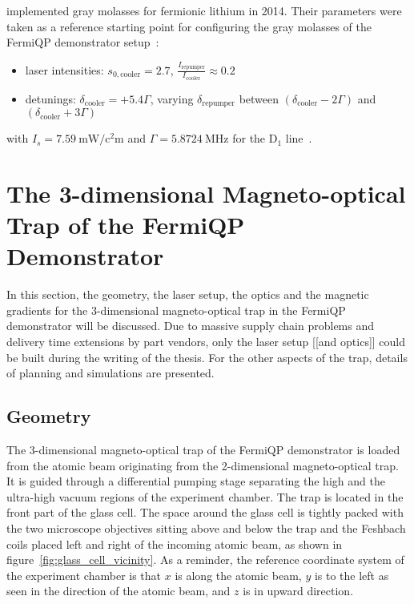 \citeauthor{burchianti_efficient_2014} implemented gray molasses for fermionic lithium in 2014. Their parameters were taken as a reference starting point for configuring the gray molasses of the FermiQP demonstrator setup~\cite{burchianti_efficient_2014}:
\begin{itemize}
    \item laser intensities: $s_{0, \text{cooler}} = 2.7$, $\frac{I_\text{repumper}}{I_\text{cooler}} \approx 0.2$
    \item detunings: $\delta_\text{cooler} = +5.4 \Gamma$, varying $\delta_\text{repumper}$ between $(\delta_\text{cooler} -2 \Gamma)$ and  $(\delta_\text{cooler}+ 3\Gamma)$
\end{itemize}
with $I_s = \SI{7.59}{\milli\watt\per\square\centi\meter}$ and $\Gamma = \SI{5.8724}{\mega\hertz}$ for the D$_1$ line~\cite{gehm_properties_2003}.


\section{The 3-dimensional Magneto-optical Trap of the FermiQP Demonstrator}
In this section, the geometry, the laser setup, the optics and the magnetic gradients for the 3-dimensional magneto-optical trap in the FermiQP demonstrator will be discussed. Due to massive supply chain problems and delivery time extensions by part vendors, only the laser setup [[and optics]] could be built during the writing of the thesis. For the other aspects of the trap, details of planning and simulations are presented.

\subsection*{Geometry}
The 3-dimensional magneto-optical trap of the FermiQP demonstrator is loaded from the atomic beam originating from the 2-dimensional magneto-optical trap. It is guided through a differential pumping stage separating the high and the ultra-high vacuum regions of the experiment chamber. The trap is located in the front part of the glass cell. The space around the glass cell is tightly packed with the two microscope objectives sitting above and below the trap and the Feshbach coils placed left and right of the incoming atomic beam, as shown in figure~\ref{fig:glass_cell_vicinity}. As a reminder, the reference coordinate system of the experiment chamber is that $x$ is along the atomic beam, $y$ is to the left as seen in the direction of the atomic beam, and $z$ is in upward direction.

